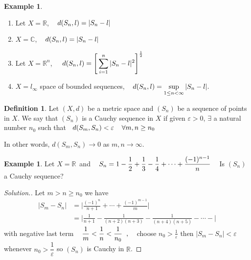 \documentclass[11pt,a4paper]{article}
\theoremstyle{definition}
\newtheorem{defn}[thm]{Definition}
\newtheorem{exa}[thm]{Example}
\newenvironment{solution}
  {\renewcommand{\qedsymbol}{}\begin{proof}[\textit{Solution}.]}
  {\end{proof}}
\begin{document}
\begin{exa}
\begin{enumerate}
\item Let $X=\mathbb{R}$, $\hspace{0.3cm} d(S_n,l)=|S_n-l|$
\item $X=\mathbb{C}$, $\hspace{0.3cm} d(S_n,l)=|S_n-l|$
\item Let $X=\mathbb{R}^n$, $\hspace{0.4cm}\displaystyle{ d(S_n,l)=\Bigg[\sum^n_{i=1}|S_n-l|^2\Bigg]^{\frac{1}{2}}}$
\item $X=l_{\infty}$ space of bounded sequences, $\hspace{0.3cm}\displaystyle{ d(S_n,l)=\sup_{1\leq n<\infty}|S_n-l|}.$
\end{enumerate}
\end{exa}


\begin{defn}
Let $(X,d)$ be a metric space and $(S_n)$ be a sequence of points in $X$. We say that $(S_n)$ is a Cauchy sequence in $X$ if given $\varepsilon >0$, $\exists$ a natural number $n_0$ such that $\hspace{0.2cm}\displaystyle{ d(S_m,S_n)<\varepsilon \hspace{0.4cm} \forall m,n\geq n_0}$


In other words, $d(S_m,S_n)\rightarrow 0$ as $m,n\rightarrow \infty$.

\end{defn}


\begin{exa}
Let $X=\mathbb{R}\,$ and $\hspace{0.3cm}\displaystyle{ S_n=1-\frac{1}{2}+\frac{1}{3}-\frac{1}{4}+\cdots+\frac{(-1)^{n-1}}{n}}\hspace{0.3cm}$ Is $(S_n)$ a Cauchy sequence?

\end{exa}

\begin{solution}
Let $m>n\geq n_0$ we have 
\begin{align*}
|S_m-S_n| &=\Big|\frac{(-1)^{n}}{n+1}+\cdots+\frac{(-1)^{m-1}}{m}\Big|\\
          &=\Big|\frac{1}{n+1}-\frac{1}{(n+2)(n+3)}-\frac{1}{(n+4)(n+5)}-\cdots-\Big|
\end{align*}
with negative last term $\hspace{0.3cm}\dfrac{1}{m}<\dfrac{1}{n}<\dfrac{1}{n_0}\hspace{0.2cm},\hspace{0.3cm}$ choose $n_0>\frac{1}{\varepsilon}$ then $|S_m-S_n|<\varepsilon$ whenever $n_0>\dfrac{1}{\varepsilon}$ so $(S_n)$ is Cauchy in $\mathbb{R}$.

\end{solution}
\end{document}
